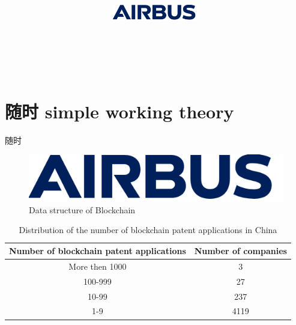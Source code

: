 \documentclass[UTF8]{article}
\title{
    \vspace{0.1in}
     \textmd{\textbf{\hmwkClass}}\\ 
    \vspace{0.1in}\large{\textit{\hmwkClassTime}}    
    \vspace{1.5in}
    \begin{figure}[H]
    	\centering
	    \includegraphics[width=1.5in]{1.png}
    \end{figure}          
 		\vspace{3in}
 		\textmd{\textbf{\hmwkAuthorName}}\\
		\vspace{0.5in}
}
\date{}
\begin{document}
\maketitle
\pagebreak
\newpage





\begin{center}
	\listoffigures
\end{center}
\pagebreak


\begin{center}
	\listoftables
\end{center}
\pagebreak




\tableofcontents


\pagebreak
\section{随时 simple working theory}
随时

\begin{figure}[H]
	\centering
	\includegraphics[width=0.6\linewidth]{1}
	\caption{Data structure of Blockchain}
\end{figure}


\begin{table}[H]
\centering
\begin{tabular}{|c|c|}
	\hline 
	Number of blockchain patent applications& Number of companies \\ 
	\hline 
	More then 1000& 3 \\ 
	\hline 
	100-999&27  \\ 
	\hline 
	10-99& 237 \\ 
	\hline 
	1-9& 4119 \\ 
	\hline 
\end{tabular} 
\caption{Distribution of the number of blockchain patent applications in China}
\end{table}
\end{document}
